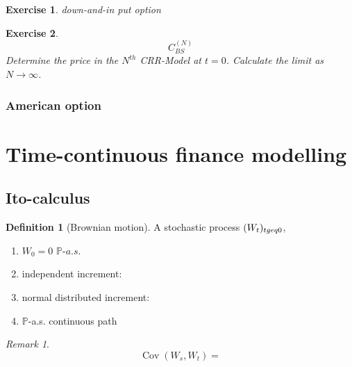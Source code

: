 \documentclass[a4paper,11pt]{book}
\newtheorem{exercise}{Exercise}[subsection]
\theoremstyle{definition}
\newtheorem{definition}{Definition}[section]
\theoremstyle{remark}
\newtheorem*{remark}{Remark}
\DeclareMathOperator{\cov}{Cov}
\begin{document}
\begin{exercise}
	down-and-in put option
\end{exercise}

\begin{exercise}
	\begin{equation*}
		C_{BS}^{(N)}
	\end{equation*}
	Determine the price in the $N^{th}$ CRR-Model at $t = 0$. Calculate the limit as $N \rightarrow \infty$. 
\end{exercise}


\subsubsection{American option}




\newpage
\section{Time-continuous finance modelling}
\subsection{Ito-calculus}
\begin{definition}[Brownian motion]
	A stochastic process $(W_t)_{t \\geq 0}$, 
	\begin{enumerate}
		\item $W_0 = 0$ $\mathbb{P}$-$a.s.$
		\item independent increment:
		\item normal distributed increment:
		\item $\mathbb{P}$-a.s. continuous path
	\end{enumerate}
\end{definition}
\begin{remark}
\begin{equation*}
	\cov(W_s, W_t) =  
\end{equation*}	
\end{remark}
\end{document}
